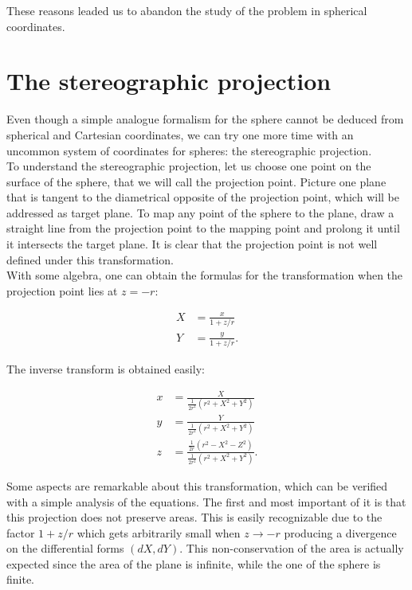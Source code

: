 These reasons leaded us to abandon the study of the problem in spherical coordinates.\\


\section{The stereographic projection}
Even though a simple analogue formalism for the sphere cannot be deduced from spherical and Cartesian coordinates, we can try one more time with an uncommon system of coordinates for spheres: the stereographic projection.\\

To understand the stereographic projection, let us choose one point on the surface of the sphere, that we will call the projection point. Picture one plane that is tangent to the diametrical opposite of the projection point, which will be addressed as target plane. To map any point of the sphere to the plane, draw a straight line from the projection point to the mapping point and prolong it until it intersects the target plane. It is clear that the projection point is not well defined under this transformation.\\

With some algebra, one can obtain the formulas for the transformation when the projection point lies at $z=-r$:

\begin{align*}
X &= \frac{x}{1+z/r}\\
Y &= \frac{y}{1+z/r}.
\end{align*}

The inverse transform is obtained easily:

\begin{align*}
x &= \frac{X}{\frac{1}{2r^2}(r^2+X^2+Y^2)}\\
y &= \frac{Y}{\frac{1}{2r^2}(r^2+X^2+Y^2)}\\
z &= \frac{\frac{1}{2r}(r^2-X^2-Z^2)}{\frac{1}{2r^2}(r^2+X^2+Y^2)}.
\end{align*}

Some aspects are remarkable about this transformation, which can be verified with a simple analysis of the equations. The first and most important of it is that this projection does not preserve areas. This is easily recognizable due to the factor $1+z/r$ which gets arbitrarily small when $z\to -r$ producing a divergence on the differential forms $(dX,dY)$. This non-conservation of the area is actually expected since the area of the plane is infinite, while the one of the sphere is finite.\\

